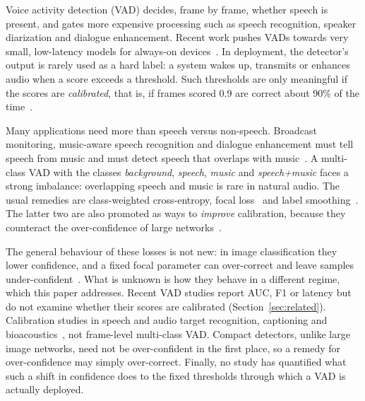 \documentclass[conference]{IEEEtran}
\newcommand{\spmu}{speech+music}
\begin{document}
Voice activity detection (VAD) decides, frame by frame, whether speech is present, and gates more expensive processing such as speech recognition, speaker diarization and dialogue enhancement. Recent work pushes VADs towards very small, low-latency models for always-on devices~\cite{bauer2026kilovad,cohen2026s4vad,jafarzadeh2025tinyvad}. In deployment, the detector's output is rarely used as a hard label: a system wakes up, transmits or enhances audio when a score exceeds a threshold. Such thresholds are only meaningful if the scores are \emph{calibrated}, that is, if frames scored 0.9 are correct about 90\% of the time~\cite{guo2017calibration}.

Many applications need more than speech versus non-speech. Broadcast monitoring, music-aware speech recognition and dialogue enhancement must tell speech from music and must detect speech that overlaps with music~\cite{grundhuber2025srsad,hung2021avaspeechsmad}. A multi-class VAD with the classes \emph{background}, \emph{speech}, \emph{music} and \emph{\spmu} faces a strong imbalance: overlapping speech and music is rare in natural audio. The usual remedies are class-weighted cross-entropy, focal loss~\cite{lin2017focal} and label smoothing~\cite{muller2019labelsmoothing}. The latter two are also promoted as ways to \emph{improve} calibration, because they counteract the over-confidence of large networks~\cite{mukhoti2020focal,muller2019labelsmoothing}.

The general behaviour of these losses is not new: in image classification they lower confidence, and a fixed focal parameter can over-correct and leave samples under-confident~\cite{ghosh2022adafocal}. What is unknown is how they behave in a different regime, which this paper addresses. Recent VAD studies report AUC, F1 or latency but do not examine whether their scores are calibrated (Section~\ref{sec:related}). Calibration studies in speech and audio target recognition, captioning and bioacoustics~\cite{huo2025overconfidence,dunker2025aac,schwinger2026bird}, not frame-level multi-class VAD. Compact detectors, unlike large image networks, need not be over-confident in the first place, so a remedy for over-confidence may simply over-correct. Finally, no study has quantified what such a shift in confidence does to the fixed thresholds through which a VAD is actually deployed.
\end{document}
